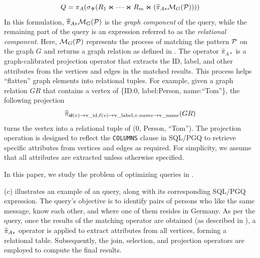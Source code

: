 \begin{equation}
    \label{eq:spjm}
Q = \pi_A(\sigma_\Psi(R_1 \Join \cdots \Join R_m \Join (\widehat{\pi}_{A*}\mathcal{M}_G(\mathcal{P}))))
\end{equation}
In this formulation, \(\widehat{\pi}_{A*}\mathcal{M}_G(\mathcal{P})\) is the \emph{graph component} of
the query, while the remaining part of the query is an \spj expression referred to as the \emph{relational component}.
Here, \(\mathcal{M}_G(\mathcal{P})\) represents the process of matching the pattern \(\mathcal{P}\) on the graph \(G\) and
returns a graph relation as defined in . The operator \(\widehat{\pi}_{A*}\) is a
graph-calibrated projection operator that extracts the ID, label, and other attributes from the vertices and edges in the matched results.
This process helps ``flatten'' graph elements into relational tuples.
For example, given a graph relation $GR$ that contains a vertex of \{ID:0, label:Person, name:``Tom''\}, the
following projection
\[
\widehat{\pi}_{{\mathsf{id}}(v) \rightarrow \text{v\_id}, \mathcal{\ell}(v) \rightarrow \text{v\_label}, v.name \rightarrow \text{v\_name}}(GR)
\]
turns the vertex into a relational tuple of (0, Person, ``Tom'').
The projection operation is designed to reflect the \lstinline{COLUMNS} clause in SQL/PGQ
to retrieve specific attributes from vertices and edges as required. For simplicity, we assume that all
attributes are extracted unless otherwise specified.

In this paper, we study the problem of optimizing \spjm queries in .

\begin{example}
    (c) illustrates an example of an \spjm query, along with its corresponding SQL/PGQ expression. The query's objective is to identify pairs of persons who like the same message, know each other, and where one of them resides in Germany. As per the query, once the results of the matching operator are obtained (as described in ), a $\widehat{\pi}_{A*}$ operator is applied to extract attributes from all vertices, forming a relational table. Subsequently, the join, selection, and projection operators are employed to compute the final results.
\end{example}

